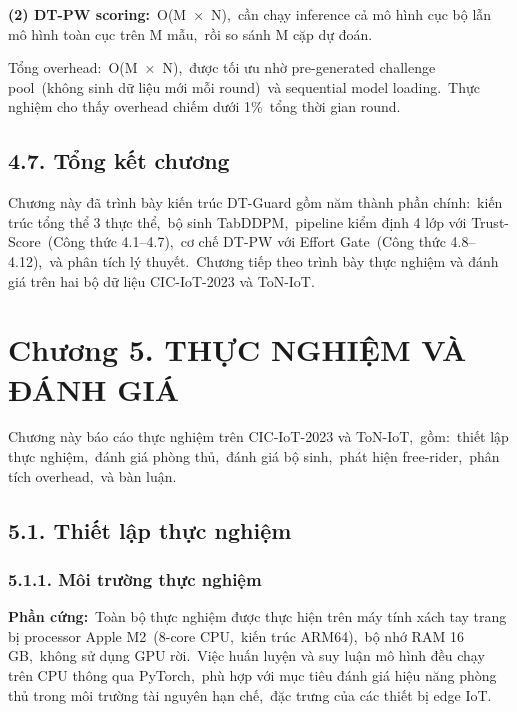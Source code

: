 \textbf{(2) DT-PW scoring:}~O(M~×~N),~cần chạy inference cả mô hình cục bộ lẫn mô hình toàn cục trên M mẫu,~rồi so sánh M cặp dự đoán.

Tổng overhead:~O(M~×~N),~được tối ưu nhờ pre-generated challenge pool~(không sinh dữ liệu mới mỗi round)~và sequential model loading.~Thực nghiệm cho thấy overhead chiếm dưới 1\%~tổng thời gian round.

\subsection{4.7. Tổng kết chương}\label{tux1ed5ng-kux1ebft-chux1b0ux1a1ng-2}

Chương này đã trình bày kiến trúc DT-Guard gồm năm thành phần chính:~kiến trúc tổng thể 3 thực thể,~bộ sinh TabDDPM,~pipeline kiểm định 4 lớp với Trust-Score~(Công thức 4.1--4.7),~cơ chế DT-PW với Effort Gate~(Công thức 4.8--4.12),~và phân tích lý thuyết.~Chương tiếp theo trình bày thực nghiệm và đánh giá trên hai bộ dữ liệu CIC-IoT-2023 và ToN-IoT.

\section{Chương 5. THỰC NGHIỆM VÀ ĐÁNH GIÁ}\label{chux1b0ux1a1ng-5.-thux1ef1c-nghiux1ec7m-vuxe0-ux111uxe1nh-giuxe1}

Chương này báo cáo thực nghiệm trên CIC-IoT-2023 và ToN-IoT,~gồm:~thiết lập thực nghiệm,~đánh giá phòng thủ,~đánh giá bộ sinh,~phát hiện free-rider,~phân tích overhead,~và bàn luận.

\subsection{5.1. Thiết lập thực nghiệm}\label{thiux1ebft-lux1eadp-thux1ef1c-nghiux1ec7m}

\subsubsection{5.1.1. Môi trường thực nghiệm}\label{muxf4i-trux1b0ux1eddng-thux1ef1c-nghiux1ec7m}

\textbf{Phần cứng:}~Toàn bộ thực nghiệm được thực hiện trên máy tính xách tay trang bị processor Apple M2~(8-core CPU,~kiến trúc ARM64),~bộ nhớ RAM 16 GB,~không sử dụng GPU rời.~Việc huấn luyện và suy luận mô hình đều chạy trên CPU thông qua PyTorch,~phù hợp với mục tiêu đánh giá hiệu năng phòng thủ trong môi trường tài nguyên hạn chế,~đặc trưng của các thiết bị edge IoT.

